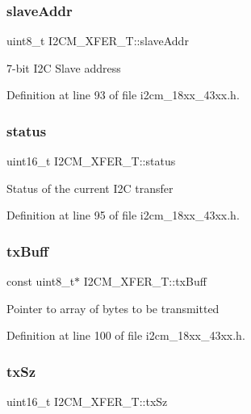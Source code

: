 \subsubsection{\texorpdfstring{slave\+Addr}{slaveAddr}}
{\footnotesize\ttfamily uint8\+\_\+t I2\+C\+M\+\_\+\+X\+F\+E\+R\+\_\+\+T\+::slave\+Addr}

7-\/bit I2C Slave address 

Definition at line 93 of file i2cm\+\_\+18xx\+\_\+43xx.\+h.

\mbox{\label{struct_i2_c_m___x_f_e_r___t_ac8151ea4555b8a05bbc2808f7b418076}} 
\subsubsection{\texorpdfstring{status}{status}}
{\footnotesize\ttfamily uint16\+\_\+t I2\+C\+M\+\_\+\+X\+F\+E\+R\+\_\+\+T\+::status}

Status of the current I2C transfer 

Definition at line 95 of file i2cm\+\_\+18xx\+\_\+43xx.\+h.

\mbox{\label{struct_i2_c_m___x_f_e_r___t_a14a9cf03095629facbeee4863399f31f}} 
\subsubsection{\texorpdfstring{tx\+Buff}{txBuff}}
{\footnotesize\ttfamily const uint8\+\_\+t$\ast$ I2\+C\+M\+\_\+\+X\+F\+E\+R\+\_\+\+T\+::tx\+Buff}

Pointer to array of bytes to be transmitted 

Definition at line 100 of file i2cm\+\_\+18xx\+\_\+43xx.\+h.

\mbox{\label{struct_i2_c_m___x_f_e_r___t_ac5cf574f3cfeade1ff3618a1dcd516e0}} 
\subsubsection{\texorpdfstring{tx\+Sz}{txSz}}
{\footnotesize\ttfamily uint16\+\_\+t I2\+C\+M\+\_\+\+X\+F\+E\+R\+\_\+\+T\+::tx\+Sz}

